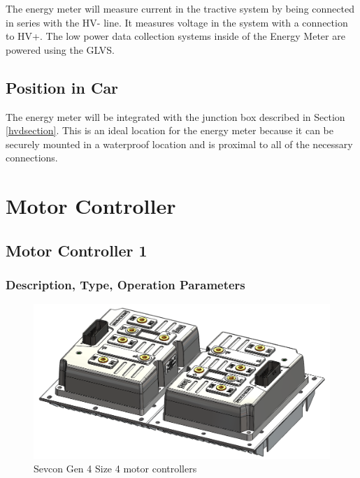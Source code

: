 \documentclass{article}
\begin{document}
        The energy meter will measure current in the tractive system by being connected in series with the HV- line. It measures voltage in the system with a connection to HV+. The low power data collection systems inside of the Energy Meter are powered using the GLVS.
        
    \subsection{Position in Car}

        The energy meter will be integrated with the junction box described in Section \ref{hvdsection}. This is an ideal location for the energy meter because it can be securely mounted in a waterproof location and is proximal to all of the necessary connections.

\newpage

\section{Motor Controller} \label{MCs}

    \subsection{Motor Controller 1} \label{MC1}

        \subsubsection{Description, Type, Operation Parameters}

            
            \begin{figure}[H]
                \centering
                \includegraphics[width = 0.7 \textwidth]{motorcontrollers_separate}
                \caption{Sevcon Gen 4 Size 4 motor controllers}
                \label{mcoffcar}
            \end{figure}
            
\end{document}
